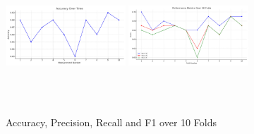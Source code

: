 \begin{figure}[h!]
  \centering

  \includegraphics[width=0.4\textwidth, height=5cm]{resources/2acc-kf.jpeg} \hspace{3em}
  \includegraphics[width=0.4\textwidth, height=5cm]{resources/2perf-kf.jpeg}

  \caption{Accuracy, Precision, Recall and F1 over 10 Folds}
\end{figure}
\pagebreak
